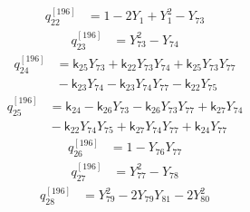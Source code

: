 \begin{equation}\label{q196:row:022}
\begin{aligned}
q_{22}^{[196]} &={} 1 - 2Y_{1} + Y_{1}^{2} - Y_{73}
\end{aligned}
\end{equation}
\begin{equation}\label{q196:row:023}
\begin{aligned}
q_{23}^{[196]} &={} Y_{73}^{2} - Y_{74}
\end{aligned}
\end{equation}
\begin{equation}\label{q196:row:024}
\begin{aligned}
q_{24}^{[196]} &={} \mathsf{k}_{25}Y_{73} + \mathsf{k}_{22}Y_{73}Y_{74} + \mathsf{k}_{25}Y_{73}Y_{77}\\
&{} - \mathsf{k}_{23}Y_{74} - \mathsf{k}_{23}Y_{74}Y_{77} - \mathsf{k}_{22}Y_{75}
\end{aligned}
\end{equation}
\begin{equation}\label{q196:row:025}
\begin{aligned}
q_{25}^{[196]} &={} \mathsf{k}_{24} - \mathsf{k}_{26}Y_{73} - \mathsf{k}_{26}Y_{73}Y_{77} + \mathsf{k}_{27}Y_{74}\\
&{} - \mathsf{k}_{22}Y_{74}Y_{75} + \mathsf{k}_{27}Y_{74}Y_{77} + \mathsf{k}_{24}Y_{77}
\end{aligned}
\end{equation}
\begin{equation}\label{q196:row:026}
\begin{aligned}
q_{26}^{[196]} &={} 1 - Y_{76}Y_{77}
\end{aligned}
\end{equation}
\begin{equation}\label{q196:row:027}
\begin{aligned}
q_{27}^{[196]} &={} Y_{77}^{2} - Y_{78}
\end{aligned}
\end{equation}
\begin{equation}\label{q196:row:028}
\begin{aligned}
q_{28}^{[196]} &={} Y_{79}^{2} - 2Y_{79}Y_{81} - 2Y_{80}^{2}
\end{aligned}
\end{equation}
